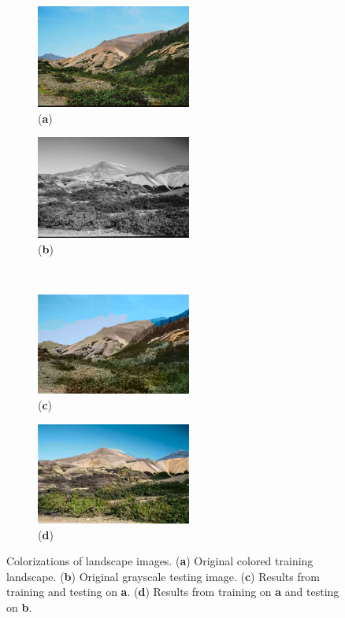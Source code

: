 \begin{figure}
    \centering
    \begin{subfigure}{2.1in}
        \centering
        \includegraphics[width=2in]{./Images/mountain_color.jpg}
        \caption{(\textbf{a})}
    \end{subfigure}
    \begin{subfigure}{2.1in}
        \centering
        \includegraphics[width=2in]{./Images/mountain_gray.png}
        \caption{(\textbf{b})}
    \end{subfigure}
    \\
    \begin{subfigure}{2.1in}
        \centering
        \includegraphics[width=2in]{./Images/mountain_recolored.png}
        \caption{(\textbf{c})}
    \end{subfigure}
    \begin{subfigure}{2.1in}
        \centering
        \includegraphics[width=2in]{./Images/mountain_gray_colored.png}
        \caption{(\textbf{d})}
    \end{subfigure}
    \caption{Colorizations of landscape images. (\textbf{a}) Original colored training landscape. (\textbf{b}) Original grayscale testing image. (\textbf{c})  Results from training and testing on \textbf{a}. (\textbf{d}) Results from training on \textbf{a} and testing on \textbf{b}.}
    \label{fig:landscape}
\end{figure}